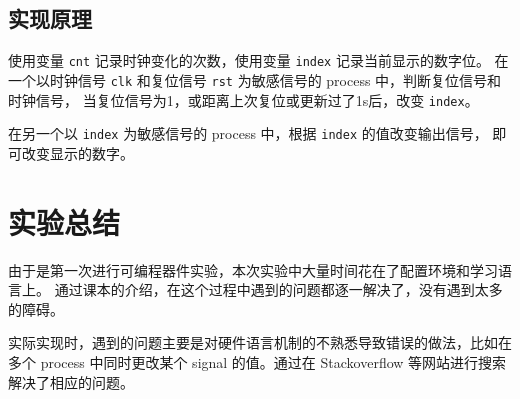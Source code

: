 \documentclass[a4paper]{article}
\begin{document}
\subsection{实现原理}

使用变量 \texttt{cnt} 记录时钟变化的次数，使用变量 \texttt{index} 记录当前显示的数字位。
在一个以时钟信号 \texttt{clk} 和复位信号 \texttt{rst} 为敏感信号的 process 中，判断复位信号和时钟信号，
当复位信号为1，或距离上次复位或更新过了1s后，改变 \texttt{index}。

在另一个以 \texttt{index} 为敏感信号的 process 中，根据 \texttt{index} 的值改变输出信号，
即可改变显示的数字。

\section{实验总结}

由于是第一次进行可编程器件实验，本次实验中大量时间花在了配置环境和学习语言上。
通过课本的介绍，在这个过程中遇到的问题都逐一解决了，没有遇到太多的障碍。

实际实现时，遇到的问题主要是对硬件语言机制的不熟悉导致错误的做法，比如在多个 process 中同时更改某个
signal 的值。通过在 Stackoverflow 等网站进行搜索解决了相应的问题。
\end{document}

